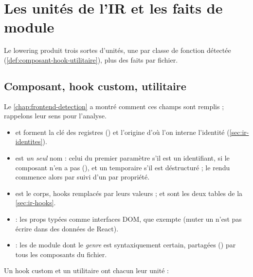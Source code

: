 \section{Les unités de l'IR et les faits de module}
\label{sec:ir-unites}

Le lowering produit trois sortes d'unités, une par classe de fonction détectée (\cref{def:composant-hook-utilitaire}), plus des faits par fichier.

\subsection{Composant, hook custom, utilitaire}


Le \cref{chap:frontend-detection} a montré comment ces champs sont remplis ; rappelons leur sens pour l'analyse.

\begin{itemize}
  \item {} et  forment la clé  des registres () et l'origine  d'où l'on interne l'identité (\cref{sec:ir-identites}).
  \item {} est \emph{un seul} nom : celui du premier paramètre s'il est un identifiant,  si le composant n'en a pas (), et un temporaire  s'il est déstructuré ; le rendu commence alors par  suivi d'un  par propriété.
  \item {} est le corps, hooks remplacés par leurs valeurs ;  et  sont les deux tables de la \cref{sec:ir-hooks}.
  \item {} : les props typées comme interfaces DOM, que  exempte (muter un  n'est pas écrire dans des données de React).
  \item {} : les  de module dont le \emph{genre} est syntaxiquement certain, partagées () par tous les composants du fichier.
\end{itemize}

Un hook custom et un utilitaire ont chacun leur unité :



